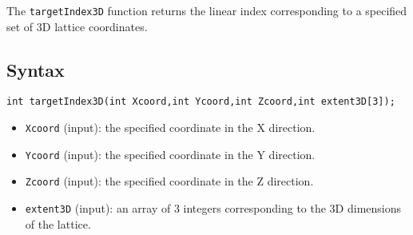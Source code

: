 The \verb+targetIndex3D+ function returns the linear index corresponding to a specified set of 3D lattice coordinates.

\subsection{Syntax}
\begin{verbatim}
int targetIndex3D(int Xcoord,int Ycoord,int Zcoord,int extent3D[3]);
\end{verbatim}

\begin{itemize}
\item \verb+Xcoord+ (input): the specified coordinate in the X direction.
\item \verb+Ycoord+ (input): the specified coordinate in the Y direction.
\item \verb+Zcoord+ (input): the specified coordinate in the Z direction.
\item \verb+extent3D+ (input): an array of 3 integers corresponding to the 3D dimensions of the lattice.
\end{itemize}

